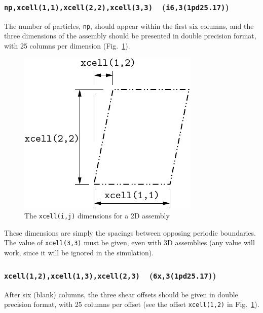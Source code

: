 \documentclass[letterpaper,11pt]{article}
\newcommand{\Var}[2]{\texttt{#1}\ \  (\texttt{#2})}
\begin{document}
\subsubsection[\texttt{np, xcell(1,1)}]{\Var{np,xcell(1,1),xcell(2,2),xcell(3,3)}{i6,3(1pd25.17)}}%
\label{sec:xcell11}
The number of particles, \texttt{np}, 
should appear within the first six columns,
and the three dimensions of the assembly should be presented
in double precision format, with 25 columns per 
dimension (Fig.~\ref{fig:xcells}).
\begin{figure}
  \centering
  \includegraphics{Figures/xcells.pdf}
  \caption{The \texttt{xcell(i,j)} dimensions for a 2D assembly}
  \label{fig:xcells}
\end{figure}
These dimensions are simply the spacings between opposing periodic
boundaries.
The value of \texttt{xcell(3,3)} must be given, even with
3D assemblies (any value will work, since it will be ignored in the
simulation).
%
\subsubsection[\texttt{xcell(1,2)}]{\Var{xcell(1,2),xcell(1,3),xcell(2,3)}{6x,3(1pd25.17)}}%
\label{sec:xcell12}
After six (blank) columns, the
three shear offsets should be given in double precision format, 
with 25 columns per offset (see the
offset \texttt{xcell(1,2)} in Fig.~\ref{fig:xcells}).
%
\end{document}
